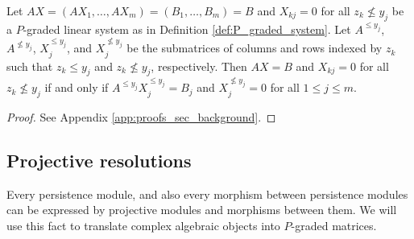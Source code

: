 \documentclass[english,a4paper,nolineno,cleveref]{socg-lipics-v2021}
\begin{document}
\begin{proposition} \label{prop:eliminate_constraints}
Let $AX=(AX_1,\ldots,AX_m)=(B_1,\ldots,B_m)=B$ and $X_{kj}=0$ for all $z_k\nleq y_j$ be a $P$-graded linear system as in Definition \ref{def:P_graded_system}. Let $A^{\leq y_j}$, $A^{\nleq y_j}$, $X_j^{\leq y_j}$, and $X_j^{\nleq y_j}$ be the submatrices of columns and rows indexed by $z_k$ such that $z_k\leq y_j$ and $z_k\nleq y_j$, respectively. Then $AX=B$ and $X_{kj}=0$ for all $z_k\nleq y_j$ if and only if $A^{\leq y_j}X^{\leq y_j}_j=B_j$ and $X_j^{\nleq y_j}=0$ for all $1\leq j\leq m$. 
\end{proposition}

\begin{proof}
See Appendix \ref{app:proofs_sec_background}.
\end{proof}

\subsection{Projective resolutions} \label{subsec:projective_resolutions}

Every persistence module, and also every morphism between persistence modules can be expressed by projective modules and morphisms between them. We will use this fact to translate complex algebraic objects into $P$-graded matrices.  
\end{document}
